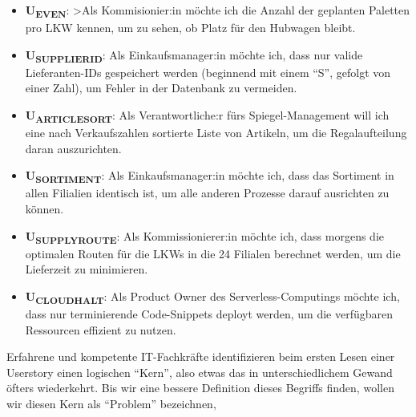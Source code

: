 \begin{itemize}
    \item \textbf{U\textsubscript{EVEN}}:
        >Als Kommisionier:in möchte ich die Anzahl der geplanten Paletten pro LKW kennen,
         um zu sehen, ob Platz für den Hubwagen bleibt.
     \item \textbf{U\textsubscript{SUPPLIERID}}:
         Als Einkaufsmanager:in möchte ich,
        dass nur valide Lieferanten-IDs gespeichert werden
        (beginnend mit einem ``S'', gefolgt von einer Zahl),
        um Fehler in der Datenbank zu vermeiden.
     \item \textbf{U\textsubscript{ARTICLESORT}}:
        Als Verantwortliche:r fürs Spiegel-Management
        will ich eine nach Verkaufszahlen sortierte Liste von Artikeln,
        um die Regalaufteilung daran auszurichten.
    \item \textbf{U\textsubscript{SORTIMENT}}:
        Als Einkaufsmanager:in möchte ich,
        dass das Sortiment in allen Filialien identisch ist,
        um alle anderen Prozesse darauf ausrichten zu können.
    \item \textbf{U\textsubscript{SUPPLYROUTE}}:
        Als Kommissionierer:in möchte ich,
        dass morgens die optimalen Routen für die LKWs in die 24 Filialen berechnet werden,
        um die Lieferzeit zu minimieren.
    \item \textbf{U\textsubscript{CLOUDHALT}}:
        Als Product Owner des Serverless-Computings möchte ich,
        dass nur terminierende Code-Snippets deployt werden,
        um die verfügbaren Ressourcen effizient zu nutzen.
\end{itemize}

Erfahrene und kompetente IT-Fachkräfte identifizieren beim ersten Lesen einer Userstory
einen logischen ``Kern'',
also etwas das in unterschiedlichem Gewand öfters wiederkehrt.
Bis wir eine bessere Definition dieses Begriffs finden,
wollen wir diesen Kern als ``Problem'' bezeichnen,

